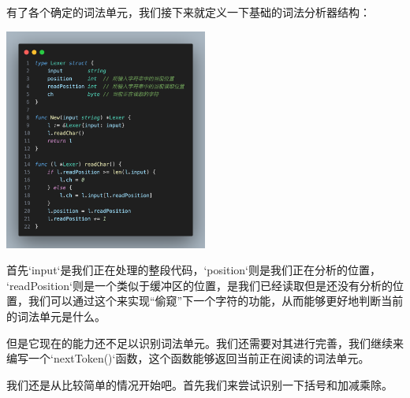 \documentclass{beamer}
\begin{document}
    \begin{frame}
        有了各个确定的词法单元，我们接下来就定义一下基础的词法分析器结构：

        \centering
        \includegraphics[width=0.5\textwidth]{pics/lexer}
    \end{frame}
    \begin{frame}
        首先`input`是我们正在处理的整段代码，`position`则是我们正在分析的位置，
        `readPosition`则是一个类似于缓冲区的位置，是我们已经读取但是还没有分析的位置，我们可以通过这个来实现“偷窥”下一个字符的功能，从而能够更好地判断当前的词法单元是什么。

        但是它现在的能力还不足以识别词法单元。我们还需要对其进行完善，我们继续来编写一个`nextToken()`函数，这个函数能够返回当前正在阅读的词法单元。
        
        我们还是从比较简单的情况开始吧。首先我们来尝试识别一下括号和加减乘除。
    \end{frame}
\end{document}
